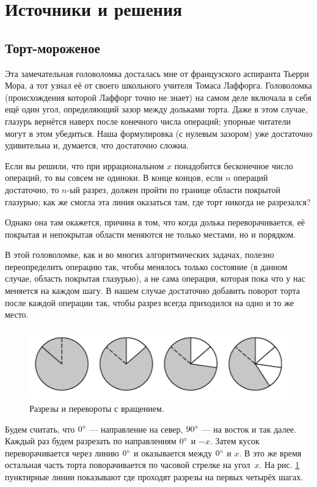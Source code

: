 \section*{Источники и решения}

\subsection*{Торт-мороженое}

Эта замечательная головоломка досталась мне от французского аспиранта Тьерри Мора,
а тот узнал её от своего школьного учителя Томаса Лаффорга.
Головоломка (происхождения которой Лаффорг точно не знает) на самом деле включала в себя ещё один угол, определяющий зазор между дольками торта.
Даже в этом случае, глазурь вернётся наверх после конечного числа операций;
упорные читатели могут в этом убедиться.
Наша формулировка (с нулевым зазором) уже достаточно удивительна и, думается, что достаточно сложна.

Если вы решили, что при иррациональном $x$ понадобится бесконечное число операций, то вы совсем не одиноки.
В конце концов, если $n$ операций достаточно, то $n$-ый разрез, должен пройти по границе области покрытой глазурью;
как же смогла эта линия оказаться там, где торт никогда не разрезался?

Однако она там окажется, причина в том, что когда долька переворачивается, её покрытая и непокрытая области  меняются не только местами, но и порядком.

В этой головоломке, как и во многих алгоритмических задачах, полезно переопределить операцию так, чтобы менялось только состояние (в данном случае, область покрытая глазурью), а не сама операция, которая пока что у нас меняется на каждом шагу.
В нашем случае достаточно добавить поворот торта после каждой операции так, чтобы разрез всегда приходился на одно и то же место.


\begin{figure}[htb!]
\centering
\includegraphics[scale=.9]{pics/tort2}
\caption{Разрезы и перевороты с вращением.}
\label{pic:tort2}
\end{figure}

Будем считать, что $0\degree$ --- направление на север,
$90\degree$ --- на восток и так далее.
Каждый раз будем разрезать по направлениям $0\degree$ и $-x$.
Затем кусок переворачивается через линию $0\degree$ и оказывается между $0\degree$ и $x$.
В это же время остальная часть торта поворачивается по часовой стрелке на угол~$x$.
На рис. \ref{pic:tort2} пунктирные линии показывают где проходят разрезы на первых четырёх шагах.

